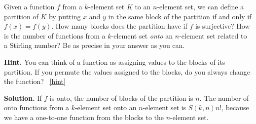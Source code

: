 \documentclass{book}
\begin{document}
\setcounter{project}{203}
\addtocounter{project}{-1}
\begin{activity}[]\label{activity-196}
\hypertarget{p-1125}{}%
Given a function \(f\) from a \(k\)-element set \(K\) to an \(n\)-element set, we can define a partition of \(K\) by putting \(x\) and \(y\) in the same block of the partition if and only if \(f(x)=f(y)\). How many blocks does the partition have if \(f\) is surjective? How is the number of functions from a \(k\)-element set \emph{onto} an \(n\)-element set related to a Stirling number? Be as precise in your answer as you can.%
\par\smallskip%
\noindent\textbf{Hint.}\hypertarget{hint-128}{}\quad%
\hypertarget{p-1126}{}%
You can think of a function as assigning values to the blocks of its partition. If you permute the values assigned to the blocks, do you always change the function?%
~\hfill{\tiny\hyperlink{a-203}{[hint]}\hypertarget{q-203}{}}\par\smallskip%
\noindent\textbf{Solution.}\hypertarget{solution-102}{}\quad%
\hypertarget{p-1127}{}%
If \(f\) is onto, the number of blocks of the partition is \(n\). The number of onto functions from a \(k\)-element set onto an \(n\)-element set is \(S(k,n)n!\), because we have a one-to-one function from the blocks to the \(n\)-element set.%
\end{activity}
\end{document}
